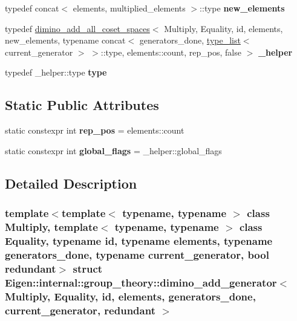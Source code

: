 \begin{DoxyCompactItemize}
typedef concat$<$ elements, multiplied\+\_\+elements $>$\+::type {\bfseries new\+\_\+elements}
\item 
\mbox{\label{struct_eigen_1_1internal_1_1group__theory_1_1dimino__add__generator_afe0cbd616ff11cc5d7144454985ac6c3}} 
typedef \hyperlink{struct_eigen_1_1internal_1_1group__theory_1_1dimino__add__all__coset__spaces}{dimino\+\_\+add\+\_\+all\+\_\+coset\+\_\+spaces}$<$ Multiply, Equality, id, elements, new\+\_\+elements, typename concat$<$ generators\+\_\+done, \hyperlink{struct_eigen_1_1internal_1_1type__list}{type\+\_\+list}$<$ current\+\_\+generator $>$ $>$\+::type, elements\+::count, rep\+\_\+pos, false $>$ {\bfseries \+\_\+helper}
\item 
\mbox{\label{struct_eigen_1_1internal_1_1group__theory_1_1dimino__add__generator_a5fa10aaef000f60fb08eeec36e97183b}} 
typedef \+\_\+helper\+::type {\bfseries type}
\end{DoxyCompactItemize}
\subsection*{Static Public Attributes}
\begin{DoxyCompactItemize}
\item 
\mbox{\label{struct_eigen_1_1internal_1_1group__theory_1_1dimino__add__generator_a05ac602a1dd458d4ea3cd61482790005}} 
static constexpr int {\bfseries rep\+\_\+pos} = elements\+::count
\item 
\mbox{\label{struct_eigen_1_1internal_1_1group__theory_1_1dimino__add__generator_a38a0906b361cea5b332e378b5bdd4b1c}} 
static constexpr int {\bfseries global\+\_\+flags} = \+\_\+helper\+::global\+\_\+flags
\end{DoxyCompactItemize}


\subsection{Detailed Description}
\subsubsection*{template$<$template$<$ typename, typename $>$ class Multiply, template$<$ typename, typename $>$ class Equality, typename id, typename elements, typename generators\+\_\+done, typename current\+\_\+generator, bool redundant$>$\newline
struct Eigen\+::internal\+::group\+\_\+theory\+::dimino\+\_\+add\+\_\+generator$<$ Multiply, Equality, id, elements, generators\+\_\+done, current\+\_\+generator, redundant $>$}



